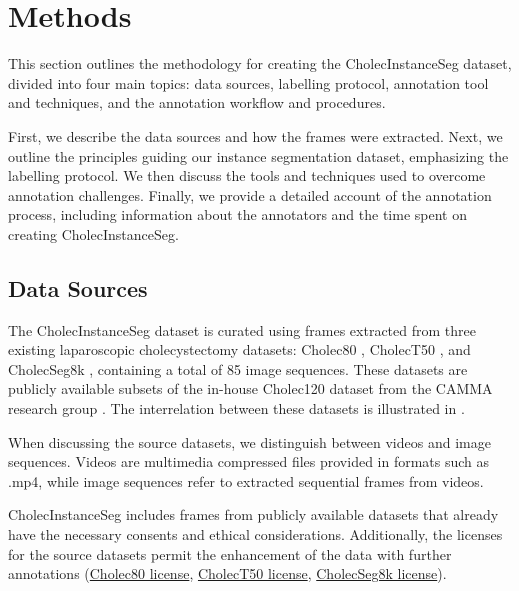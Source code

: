 \section*{Methods}
This section outlines the methodology for creating the CholecInstanceSeg dataset, divided into four main topics: data sources, labelling protocol, annotation tool and techniques, and the annotation workflow and procedures.

First, we describe the data sources and how the frames were extracted. Next, we outline the principles guiding our instance segmentation dataset, emphasizing the labelling protocol. We then discuss the tools and techniques used to overcome annotation challenges. Finally, we provide a detailed account of the annotation process, including information about the annotators and the time spent on creating CholecInstanceSeg.

\subsection*{Data Sources}
The CholecInstanceSeg dataset is curated using frames extracted from three existing laparoscopic cholecystectomy datasets: Cholec80 \cite{endonet}, CholecT50 \cite{NWOYE2022102433_rendevous}, and CholecSeg8k \cite{cholecseg8k}, containing a total of 85 image sequences. 
These datasets are publicly available subsets of the in-house Cholec120 dataset \cite{twinanda2018rsdnet} from the CAMMA research group  
. The interrelation between these datasets is illustrated in  . 

When discussing the source datasets, we distinguish between videos and image sequences. Videos are multimedia compressed files provided in formats such as .mp4, while image sequences refer to extracted sequential frames from videos. 


CholecInstanceSeg includes frames from publicly available datasets that already have the necessary consents and ethical considerations. Additionally, the licenses for the source datasets permit the enhancement of the data with further annotations (\href{https://github.com/CAMMA-public/TF-Cholec80}{Cholec80 license}, \href{https://github.com/CAMMA-public/cholect50}{CholecT50 license}, \href{https://www.kaggle.com/datasets/newslab/cholecseg8k}{CholecSeg8k license}).

